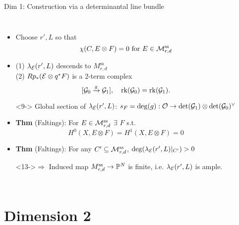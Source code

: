 \documentclass[8pt,handout]{beamer} %
\begin{document}
\begin{frame}[fragile]{Dim 1: Construction via a determinantal line bundle}
\begin{columns}[t]
    \begin{itemize}
        \item<7-> Choose $r', L$ so that
        \[ \chi(C, E \otimes F) = 0 \text{ for } E \in \mathcal{M}^{\text{ss}}_{r,d} \]
        \item<8-> (1) $\lambda_{\mathcal{E}}(r', L)$ descends to $M^{\text{ss}}_{r,d}$ \\ (2) $R p_* (\mathcal{E} \otimes q^*F)$ is a 2-term complex
        \[ [\mathcal{G}_0 \xrightarrow{g} \mathcal{G}_1], \quad \operatorname{\mathrm{rk}}(\mathcal{G}_0) = \operatorname{\mathrm{rk}}(\mathcal{G}_1). \]
        \item[]<9-> Global section of $\lambda_{\mathcal{E}}(r', L)$: $s_F = \deg(g): \mathcal{O} \to \det(\mathcal{G}_1) \otimes \det(\mathcal{G}_0)^\vee$
        \item<10-> \textbf{Thm} (Faltings): For $E \in \mathcal{M}^{\text{ss}}_{r,d}$ $\exists$ $F$ s.t.
        \[ H^0(X, E \otimes F) = H^1(X, E \otimes F) = 0 \]
        \item<12-> \textbf{Thm} (Faltings): For any $C' \subseteq \mathcal{M}^{\text{ss}}_{r,d}$, $\deg(\lambda_{\mathcal{E}}(r',L)|_{C'}) > 0$
        \item[]<13->$\Rightarrow$ Induced map $M^{\text{ss}}_{r,d} \to \mathbb{P}^N$ is finite, i.e. $\lambda_{\mathcal{E}}(r',L)$ is ample.
    \end{itemize}
\end{columns}
\end{frame}

\section{Dimension 2}
\end{document}
